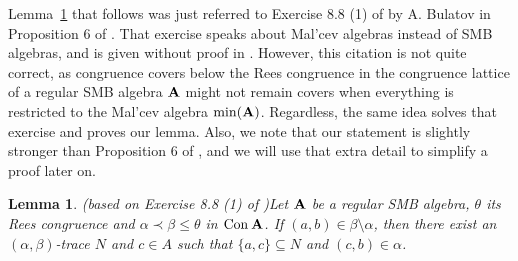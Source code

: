 \documentclass[11pt]{amsart}
\newcommand{\m}[1]{{\uppercase {\mathbf {#1}}}}
\newcommand{\con}{{\rm Con\:}}
\newcommand{\cn}[1]{{\con\m {#1}}}
\newtheorem{lm}[thm]{Lemma}
\theoremstyle{definition}
\begin{document}
Lemma~\ref{onesubtrace} that follows was just referred to Exercise 8.8 (1) of \cite{tct} by A. Bulatov in Proposition 6 of \cite{BuSMB}. That exercise speaks about Mal'cev algebras instead of SMB algebras, and is given without proof in \cite{tct}. However, this citation is not quite correct, as congruence covers below the Rees congruence in the congruence lattice of a regular SMB algebra $\m a$ might not remain covers when everything is restricted to the Mal'cev algebra $\mathrm{min}(\m a)$. Regardless, the same idea solves that exercise and proves our lemma. Also, we note that our statement is slightly stronger than Proposition 6 of \cite{BuSMB}, and we will use that extra detail to simplify a proof later on.

\begin{lm}{\rm (based on Exercise 8.8 (1) of \cite{tct})}\label{onesubtrace}
Let $\m a$ be a regular SMB algebra, $\theta$ its Rees congruence and $\alpha\prec\beta\leq \theta$ in $\cn a$. If $(a,b)\in \beta\setminus\alpha$, then there exist an $(\alpha,\beta)$-trace $N$ and $c\in A$ such that $\{a,c\}\subseteq N$ and $(c,b)\in\alpha$. 
\end{lm}
\end{document}
